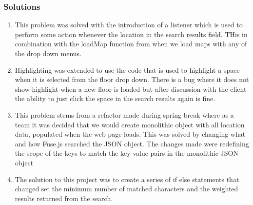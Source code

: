 \documentclass[letterpaper,10pt,serif,titlepage, onecolumn, compsoc]{IEEEtran}
\begin{document}
\subsubsection{Solutions}
\begin{enumerate}
\item This problem was solved with the introduction of a listener which is used to perform some action whenever the location in the search results field. THis in combination with the loadMap function from when we load maps with any of the drop down menus.
\item Highlighting was extended to use the code that is used to highlight a space when it is selected from the floor drop down. There is a bug where it does not show highlight when a new floor is loaded but after discussion with the client the ability to just click the space in the search results again is fine. 
\item This problem stems from a refactor made during spring break where as a team it was decided that we would create monolithic object with all location data, populated when the web page loads. This was solved by changing what and how Fuse.js searched the JSON object. The changes made were redefining the scope of the keys to match the key-value pairs in the monolithic JSON object 
\item The solution to this project was to create a series of if else statements that changed set the minimum number of matched characters and  the weighted results returned from the search.

\end{enumerate}


\newpage
\end{document}
